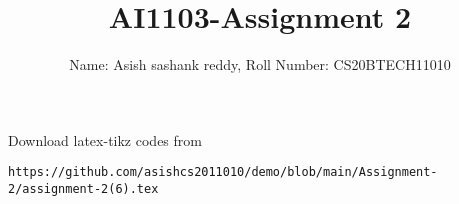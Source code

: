 \documentclass[journal,12pt,twocolumn]{IEEEtran}
\DeclareMathOperator*{\Res}{Res}
\begin{document}
\newcommand{\BEQA}{\begin{eqnarray}}
\newcommand{\EEQA}{\end{eqnarray}}
\newcommand{\define}{\stackrel{\triangle}{=}}

\raggedbottom
\setlength{\parindent}{0pt}
\providecommand{\mbf}{\mathbf}
\providecommand{\pr}[1]{\ensuremath{\Pr\left(#1\right)}}
\providecommand{\qfunc}[1]{\ensuremath{Q\left(#1\right)}}
\providecommand{\sbrak}[1]{\ensuremath{{}\left[#1\right]}}
\providecommand{\lsbrak}[1]{\ensuremath{{}\left[#1\right.}}
\providecommand{\rsbrak}[1]{\ensuremath{{}\left.#1\right]}}
\providecommand{\brak}[1]{\ensuremath{\left(#1\right)}}
\providecommand{\lbrak}[1]{\ensuremath{\left(#1\right.}}
\providecommand{\rbrak}[1]{\ensuremath{\left.#1\right)}}
\providecommand{\cbrak}[1]{\ensuremath{\left\{#1\right\}}}
\providecommand{\lcbrak}[1]{\ensuremath{\left\{#1\right.}}
\providecommand{\rcbrak}[1]{\ensuremath{\left.#1\right\}}}
\theoremstyle{remark}
\newtheorem{rem}{Remark}
\newcommand{\sgn}{\mathop{\mathrm{sgn}}}
\providecommand{\abs}[1]{\vert#1\vert}
\providecommand{\res}[1]{\Res\displaylimits_{#1}} 
\providecommand{\norm}[1]{\lVert#1\rVert}
\providecommand{\mtx}[1]{\mathbf{#1}}
\providecommand{\mean}[1]{E[ #1 ]}
\providecommand{\fourier}{\overset{\mathcal{F}}{ \rightleftharpoons}}
\providecommand{\system}{\overset{\mathcal{H}}{ \longleftrightarrow}}
\newcommand{\solution}{\noindent \textbf{Solution: }}
\newcommand{\cosec}{\,\text{cosec}\,}
\providecommand{\dec}[2]{\ensuremath{\overset{#1}{\underset{#2}{\gtrless}}}}
\newcommand{\myvec}[1]{\ensuremath{\begin{pmatrix}#1\end{pmatrix}}}
\newcommand{\mydet}[1]{\ensuremath{\begin{vmatrix}#1\end{vmatrix}}}
\makeatletter
{}
\makeatother
\let\StandardTheFigure\thefigure
\let\vec\mathbf
\renewcommand{\thefigure}{\theproblem}
\def\putbox#1#2#3{\makebox[0in][l]{\makebox[#1][l]{}\raisebox{\baselineskip}[0in][0in]{\raisebox{#2}[0in][0in]{#3}}}}
     \def\rightbox#1{\makebox[0in][r]{#1}}
     \def\centbox#1{\makebox[0in]{#1}}
     \def\topbox#1{\raisebox{-\baselineskip}[0in][0in]{#1}}
     \def\midbox#1{\raisebox{-0.5\baselineskip}[0in][0in]{#1}}
\vspace{3cm}
\title{AI1103-Assignment 2}
\author{Name: Asish sashank reddy, Roll Number: CS20BTECH11010}
\maketitle
\newpage
\bigskip
\renewcommand{\thefigure}{\theenumi}
\renewcommand{\thetable}{\theenumi}
Download latex-tikz codes from 
%
\begin{lstlisting}
https://github.com/asishcs2011010/demo/blob/main/Assignment-2/assignment-2(6).tex
\end{lstlisting}
\end{document}
